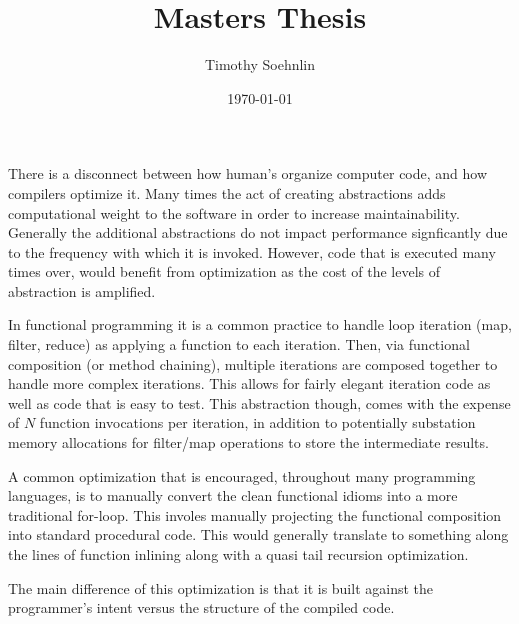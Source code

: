 \documentclass{article}
\title{Masters Thesis}
\author{Timothy Soehnlin}
\date{\today}
\begin{document}
\maketitle

There is a disconnect between how human's organize computer code, and how compilers optimize it.  Many times the act of creating abstractions adds computational weight to the software in order to increase maintainability.  Generally the additional abstractions do not impact performance signficantly due to the frequency with which it is invoked.  However, code that is executed many times over, would benefit from optimization as the cost of the levels of abstraction is amplified.  

In functional programming it is a common practice to handle loop iteration (map, filter, reduce) as applying a function to each iteration.  Then, via functional composition (or method chaining), multiple iterations are composed together to handle more complex iterations.  This allows for fairly elegant iteration code as well as code that is easy to test.  This abstraction though, comes with the expense of $N$ function invocations per iteration, in addition to potentially substation memory allocations for filter/map operations to store the intermediate results.  

A common optimization that is encouraged, throughout many programming languages, is to manually convert the clean functional idioms into a more traditional for-loop.  This involes manually projecting the functional composition into standard procedural code.  This would generally translate to something along the lines of function inlining along with a quasi tail recursion optimization.  

The main difference of this optimization is that it is built against the programmer's intent versus the structure of the compiled code.  
\end{document}
